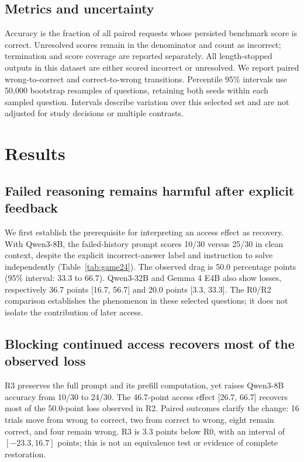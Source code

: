 \documentclass{article}
\begin{document}
\subsection{Metrics and uncertainty}

Accuracy is the fraction of all paired requests whose persisted benchmark score is correct. Unresolved scores remain in the denominator and count as incorrect; termination and score coverage are reported separately. All length-stopped outputs in this dataset are either scored incorrect or unresolved. We report paired wrong-to-correct and correct-to-wrong transitions. Percentile 95\% intervals use 50,000 bootstrap resamples of questions, retaining both seeds within each sampled question. Intervals describe variation over this selected set and are not adjusted for study decisions or multiple contrasts.

\section{Results}
\label{sec:results}

\subsection{Failed reasoning remains harmful after explicit feedback}
\label{sec:residual-drag}

We first establish the prerequisite for interpreting an access effect as recovery. With Qwen3-8B, the failed-history prompt scores 10/30 versus 25/30 in clean context, despite the explicit incorrect-answer label and instruction to solve independently (Table~\ref{tab:game24}). The observed drag is 50.0 percentage points (95\% interval: 33.3 to 66.7). Qwen3-32B and Gemma 4 E4B also show losses, respectively 36.7 points [16.7, 56.7] and 20.0 points [3.3, 33.3]. The R0/R2 comparison establishes the phenomenon in these selected questions; it does not isolate the contribution of later access.

\subsection{Blocking continued access recovers most of the observed loss}
\label{sec:main-access}

R3 preserves the full prompt and its prefill computation, yet raises Qwen3-8B accuracy from 10/30 to 24/30. The 46.7-point access effect [26.7, 66.7] recovers most of the 50.0-point loss observed in R2. Paired outcomes clarify the change: 16 trials move from wrong to correct, two from correct to wrong, eight remain correct, and four remain wrong. R3 is 3.3 points below R0, with an interval of $[-23.3,16.7]$ points; this is not an equivalence test or evidence of complete restoration.
\end{document}
